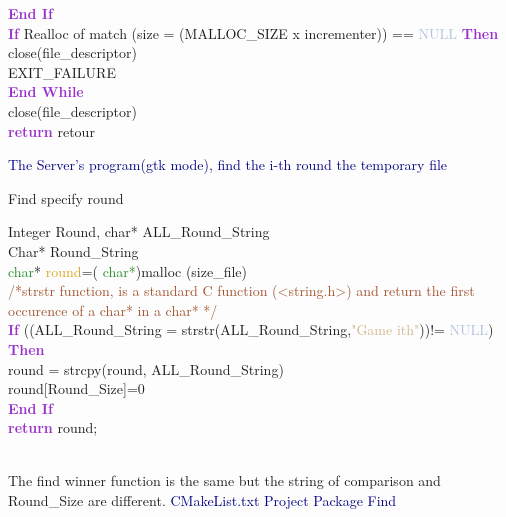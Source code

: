 \documentclass[11pt]{sample}
\renewcommand{\algorithmicendwhile}{\textcolor{DarkOrchid}{\textbf{End While}}}
\renewcommand{\algorithmicif}      {\textbf{\textcolor{DarkOrchid}{If}}}
\renewcommand{\algorithmicendif}   {\textcolor{DarkOrchid}{\textbf{End If}}}
\renewcommand{\algorithmicthen}    {\textcolor{DarkOrchid}{\textbf{Then}}}
\renewcommand{\algorithmicreturn}  {\textbf{\textcolor{DarkOrchid}{return}}}
\begin{document}
\begin{algorithm}
\begin{algorithmic}
    \hspace{4mm}\algorithmicendif\\
    \hspace{4mm}\algorithmicif{ Realloc of match (size = (MALLOC\_SIZE x incrementer)) == \textcolor{LightSteelBlue}{NULL} }\algorithmicthen\\
    \hspace{8mm}close(file\_descriptor)\\\hspace{8mm} EXIT\_FAILURE\\
    \algorithmicendwhile\\
    close(file\_descriptor)\\
    \algorithmicreturn{ retour}
  \end{algorithmic}
\end{algorithm}\newpage
\textcolor{Navy}{The Server's program(gtk mode), find the i-th round the temporary file }
\begin{algorithm}
  \caption{Find specify round}
  \begin{algorithmic}
    \REQUIRE Integer Round, char* ALL\_Round\_String\\
    \ENSURE  Char* Round\_String\\
    \vspace{2mm}
    \textcolor{ForestGreen}{char}* \textcolor{Goldenrod}{round}=( \textcolor{ForestGreen}{char*})malloc (size\_file)\\
    \textcolor{Sienna}{ /*strstr function, is a standard C function (<string.h>) and return the first occurence of a char* in a char* */}\\
     \algorithmicif{ ((ALL\_Round\_String = strstr(ALL\_Round\_String,\textcolor{Tan}{"Game ith"}))!= \textcolor{LightSteelBlue}{NULL}) }\algorithmicthen\\
     round = strcpy(round, ALL\_Round\_String)\\
     round[Round\_Size]=0\\
     \algorithmicendif\\
  \algorithmicreturn{ round;}
 \end{algorithmic}
\end{algorithm}\\
The find winner function is the same but the string of comparison and Round\_Size are different.
\newpage
\textcolor{Navy}{CMakeList.txt Project Package Find}
\end{document}
